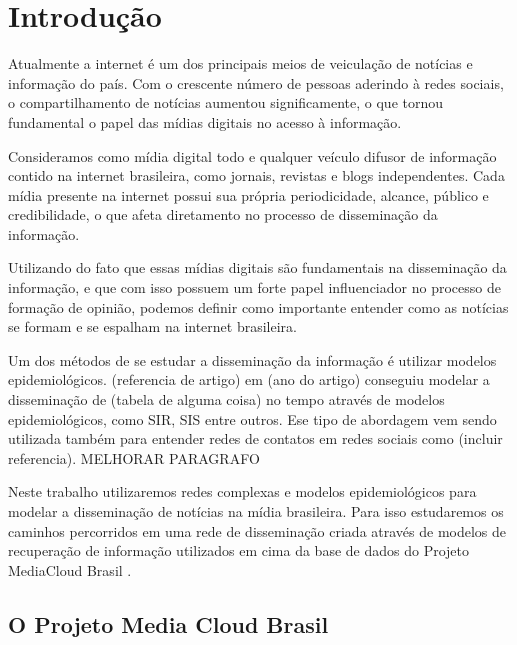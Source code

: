 \documentclass[a4paper,12pt]{article}
\begin{document}
\pagebreak

\section{Introdução}


Atualmente a internet é um dos principais meios de veiculação de notícias e informação do país. Com o crescente
número de pessoas aderindo à redes sociais, o compartilhamento de notícias aumentou significamente, o que tornou fundamental
o papel das mídias digitais no acesso à informação.

Consideramos como mídia digital todo e qualquer veículo difusor de informação contido na internet brasileira, como jornais, revistas e 
blogs independentes. Cada mídia presente na internet possui sua própria periodicidade, alcance, público e credibilidade, o que afeta
diretamento no processo de disseminação da informação.

Utilizando do fato que essas mídias digitais são fundamentais na disseminação da informação, e que com isso possuem um forte papel 
influenciador no processo de formação de opinião, podemos definir como importante entender como as notícias se formam e se espalham
na internet brasileira.

Um dos métodos de se estudar a disseminação da informação é utilizar modelos epidemiológicos. (referencia de artigo) em (ano do artigo)
conseguiu modelar a disseminação de (tabela de alguma coisa) no tempo através de modelos epidemiológicos, como SIR, SIS entre outros. Ese tipo
de abordagem vem sendo utilizada também para entender redes de contatos em redes sociais como (incluir referencia). MELHORAR PARAGRAFO

Neste trabalho utilizaremos redes complexas e modelos epidemiológicos para modelar a disseminação de notícias na mídia brasileira. 
Para isso
estudaremos os caminhos percorridos em uma rede de disseminação criada através de modelos de recuperação de informação utilizados em cima
da base de dados do Projeto MediaCloud Brasil .

\subsection{O Projeto Media Cloud Brasil}
\end{document}
